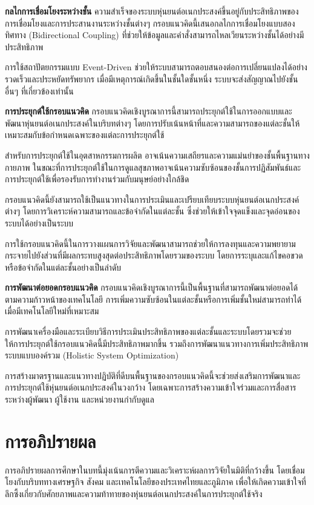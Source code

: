 \documentclass[a4paper]{article}
\begin{document}
\textbf{กลไกการเชื่อมโยงระหว่างชั้น} ความสำเร็จของระบบหุ่นยนต์อเนกประสงค์ขึ้นอยู่กับประสิทธิภาพของการเชื่อมโยงและการประสานงานระหว่างชั้นต่างๆ กรอบแนวคิดนี้เสนอกลไกการเชื่อมโยงแบบสองทิศทาง (Bidirectional Coupling) ที่ช่วยให้ข้อมูลและคำสั่งสามารถไหลเวียนระหว่างชั้นได้อย่างมีประสิทธิภาพ

การใช้สถาปัตยกรรมแบบ Event-Driven ช่วยให้ระบบสามารถตอบสนองต่อการเปลี่ยนแปลงได้อย่างรวดเร็วและประหยัดทรัพยากร เมื่อมีเหตุการณ์เกิดขึ้นในชั้นใดชั้นหนึ่ง ระบบจะส่งสัญญาณไปยังชั้นอื่นๆ ที่เกี่ยวข้องเท่านั้น

\textbf{การประยุกต์ใช้กรอบแนวคิด} กรอบแนวคิดเชิงบูรณาการนี้สามารถประยุกต์ใช้ในการออกแบบและพัฒนาหุ่นยนต์อเนกประสงค์ในบริบทต่างๆ โดยการปรับเน้นหน้าที่และความสามารถของแต่ละชั้นให้เหมาะสมกับข้อกำหนดเฉพาะของแต่ละการประยุกต์ใช้

สำหรับการประยุกต์ใช้ในอุตสาหกรรมการผลิต อาจเน้นความเสถียรและความแม่นยำของชั้นพื้นฐานทางกายภาพ ในขณะที่การประยุกต์ใช้ในการดูแลสุขภาพอาจเน้นความซับซ้อนของชั้นการปฏิสัมพันธ์และการประยุกต์ใช้เพื่อรองรับการทำงานร่วมกับมนุษย์อย่างใกล้ชิด

กรอบแนวคิดนี้ยังสามารถใช้เป็นแนวทางในการประเมินและเปรียบเทียบระบบหุ่นยนต์อเนกประสงค์ต่างๆ โดยการวิเคราะห์ความสามารถและข้อจำกัดในแต่ละชั้น ซึ่งช่วยให้เข้าใจจุดแข็งและจุดอ่อนของระบบได้อย่างเป็นระบบ

การใช้กรอบแนวคิดนี้ในการวางแผนการวิจัยและพัฒนาสามารถช่วยให้การลงทุนและความพยายามกระจายไปยังส่วนที่มีผลกระทบสูงสุดต่อประสิทธิภาพโดยรวมของระบบ โดยการระบุและแก้ไขคอขวดหรือข้อจำกัดในแต่ละชั้นอย่างเป็นลำดับ

\textbf{การพัฒนาต่อยอดกรอบแนวคิด} กรอบแนวคิดเชิงบูรณาการนี้เป็นพื้นฐานที่สามารถพัฒนาต่อยอดได้ตามความก้าวหน้าของเทคโนโลยี การเพิ่มความซับซ้อนในแต่ละชั้นหรือการเพิ่มชั้นใหม่สามารถทำได้เมื่อมีเทคโนโลยีใหม่ที่เหมาะสม

การพัฒนาเครื่องมือและระเบียบวิธีการประเมินประสิทธิภาพของแต่ละชั้นและระบบโดยรวมจะช่วยให้การประยุกต์ใช้กรอบแนวคิดนี้มีประสิทธิภาพมากขึ้น รวมถึงการพัฒนาแนวทางการเพิ่มประสิทธิภาพระบบแบบองค์รวม (Holistic System Optimization)

การสร้างมาตรฐานและแนวทางปฏิบัติที่ดีบนพื้นฐานของกรอบแนวคิดนี้จะช่วยส่งเสริมการพัฒนาและการประยุกต์ใช้หุ่นยนต์อเนกประสงค์ในวงกว้าง โดยเฉพาะการสร้างความเข้าใจร่วมและการสื่อสารระหว่างผู้พัฒนา ผู้ใช้งาน และหน่วยงานกำกับดูแล
\newpage
\section{การอภิปรายผล}
การอภิปรายผลการศึกษาในบทนี้มุ่งเน้นการตีความและวิเคราะห์ผลการวิจัยในมิติที่กว้างขึ้น โดยเชื่อมโยงกับบริบททางเศรษฐกิจ สังคม และเทคโนโลยีของประเทศไทยและภูมิภาค เพื่อให้เกิดความเข้าใจที่ลึกซึ้งเกี่ยวกับศักยภาพและความท้าทายของหุ่นยนต์อเนกประสงค์ในการประยุกต์ใช้จริง
\end{document}

